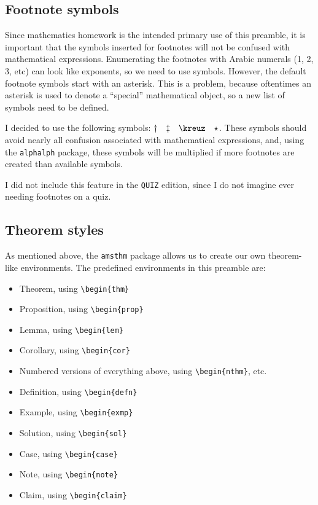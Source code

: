 \documentclass[letterpaper,12pt]{article}
\begin{document}
	\subsection{Footnote symbols} \label{footnotes}
	Since mathematics homework is the intended primary use of this preamble, it is important that the symbols inserted for footnotes will not be confused with mathematical expressions. Enumerating the footnotes with Arabic numerals (1, 2, 3, etc) can look like exponents, so we need to use symbols. However, the default footnote symbols start with an asterisk. This is a problem, because oftentimes an asterisk is used to denote a ``special'' mathematical object, so a new list of symbols need to be defined.
	
	I decided to use the following symbols: $\dag \quad \ddag \quad \kreuz \quad \star$. These symbols should avoid nearly all confusion associated with mathematical expressions, and, using the \texttt{alphalph} package, these symbols will be multiplied if more footnotes are created than available symbols.
	
	I did not include this feature in the \texttt{QUIZ} edition, since I do not imagine ever needing footnotes on a quiz.
	
	\subsection{Theorem styles} \label{thmstyles}
	As mentioned above, the \texttt{amsthm} package allows us to create our own theorem-like environments. The predefined environments in this preamble are:
	\begin{itemize}
	\item Theorem, using \verb|\begin{thm}|
	\item Proposition, using \verb|\begin{prop}|
	\item Lemma, using \verb|\begin{lem}|
	\item Corollary, using \verb|\begin{cor}|
	\item Numbered versions of everything above, using \verb|\begin{nthm}|, etc.
	\item Definition, using \verb|\begin{defn}|
	\item Example, using \verb|\begin{exmp}|
	\item Solution, using \verb|\begin{sol}|
	\item Case, using \verb|\begin{case}|
	\item Note, using \verb|\begin{note}|
	\item Claim, using \verb|\begin{claim}|
	\end{itemize}
	
\end{document}
